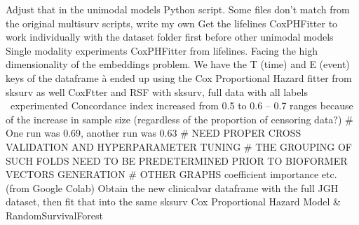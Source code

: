 \documentclass{article}%
\begin{document}
\newline%
%
Adjust that in the unimodal models Python script. %
\newline%
\newline%
%
Some files don’t match from the original multisurv scripts, write my own %
\newline%
\newline%
%
Get the lifelines CoxPHFitter to work individually with the dataset folder first before other unimodal models %
\newline%
\newline%
%
%
\newline%
\newline%
%
Single modality experiments %
\newline%
\newline%
%
CoxPHFitter from lifelines. %
\newline%
\newline%
%
Facing the high dimensionality of the embeddings problem. We have the T (time) and E (event) keys of the dataframe à ended up using the Cox Proportional Hazard fitter from sksurv as well %
\newline%
\newline%
%
CoxFtter and RSF with sksurv, full data with all labels ~experimented%
\newline%
\newline%
%
Concordance index increased from 0.5 to 0.6 – 0.7 ranges because of the increase in sample size (regardless of the proportion of censoring data?) %
\newline%
\newline%
%
\# One run was 0.69, another run was 0.63%
\newline%
\newline%
%
\# NEED PROPER CROSS VALIDATION AND HYPERPARAMETER TUNING%
\newline%
\newline%
%
\# THE GROUPING OF SUCH FOLDS NEED TO BE PREDETERMINED PRIOR TO BIOFORMER VECTORS GENERATION %
\newline%
\newline%
%
\# OTHER GRAPHS coefficient importance etc. (from Google Colab)  %
\newline%
\newline%
%
Obtain the new clinicalvar dataframe with the full JGH dataset, then fit that into the same sksurv Cox Proportional Hazard Model \& RandomSurvivalForest%
\newline%
\newline%
\end{document}
